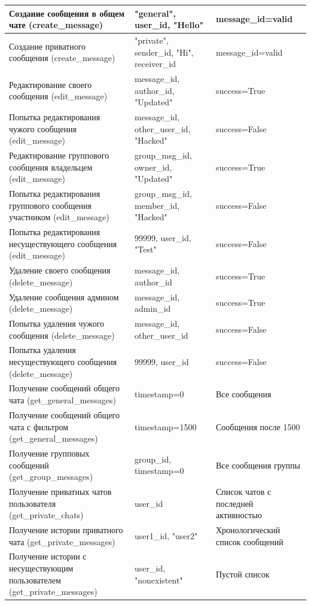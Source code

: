 \begin{xltabular}{\linewidth}{|X|X|X|}
	Создание сообщения в общем чате (create\_message) & "general", user\_id, "Hello" & message\_id=valid \\ \hline
	Создание приватного сообщения (create\_message) & "private", sender\_id, "Hi", receiver\_id & message\_id=valid \\ \hline
	Редактирование своего сообщения (edit\_message) & message\_id, author\_id, "Updated" & success=True \\ \hline
	Попытка редактирования чужого сообщения (edit\_message) & message\_id, other\_user\_id, "Hacked" & success=False \\ \hline
	Редактирование группового сообщения владельцем (edit\_message) & group\_msg\_id, owner\_id, "Updated" & success=True \\ \hline
	Попытка редактирования группового сообщения участником (edit\_message) & group\_msg\_id, member\_id, "Hacked" & success=False \\ \hline
	Попытка редактирования несуществующего сообщения (edit\_message) & 99999, user\_id, "Test" & success=False \\ \hline
	Удаление своего сообщения (delete\_message) & message\_id, author\_id & success=True \\ \hline
	Удаление сообщения админом (delete\_message) & message\_id, admin\_id & success=True \\ \hline
	Попытка удаления чужого сообщения (delete\_message) & message\_id, other\_user\_id & success=False \\ \hline
	Попытка удаления несуществующего сообщения (delete\_message) & 99999, user\_id & success=False \\ \hline
	Получение сообщений общего чата (get\_general\_messages) & timestamp=0 & Все сообщения \\ \hline
	Получение сообщений общего чата с фильтром (get\_general\_messages) & timestamp=1500 & Сообщения после 1500 \\ \hline
	Получение групповых сообщений (get\_group\_messages) & group\_id, timestamp=0 & Все сообщения группы \\ \hline
	Получение приватных чатов пользователя (get\_private\_chats) & user\_id & Список чатов с последней активностью \\ \hline
	Получение истории приватного чата (get\_private\_messages) & user1\_id, "user2" & Хронологический список сообщений \\ \hline
	Получение истории с несуществующим пользователем (get\_private\_messages) & user\_id, "nonexistent" & Пустой список \\ \hline

\end{xltabular}

